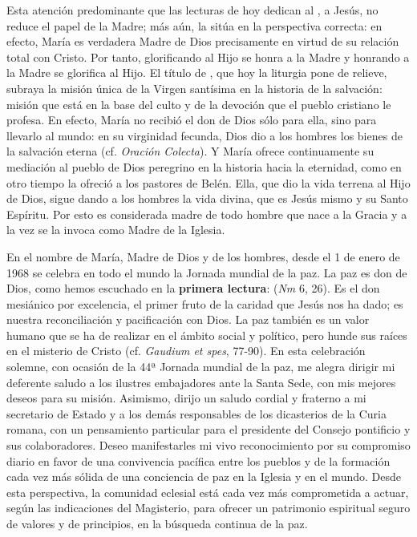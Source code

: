 {Esta atención predominante que las lecturas de hoy dedican al , a Jesús, no reduce el papel de la Madre; más aún, la sitúa en la perspectiva correcta: en efecto, María es verdadera Madre de Dios precisamente en virtud de su relación total con Cristo. Por tanto, glorificando al Hijo se honra a la Madre y honrando a la Madre se glorifica al Hijo. El título de , que hoy la liturgia pone de relieve, subraya la misión única de la Virgen santísima en la historia de la salvación: misión que está en la base del culto y de la devoción que el pueblo cristiano le profesa. En efecto, María no recibió el don de Dios sólo para ella, sino para llevarlo al mundo: en su virginidad fecunda, Dios dio a los hombres los bienes de la salvación eterna (cf. \emph{Oración Colecta}). Y María ofrece continuamente su mediación al pueblo de Dios peregrino en la historia hacia la eternidad, como en otro tiempo la ofreció a los pastores de Belén. Ella, que dio la vida terrena al Hijo de Dios, sigue dando a los hombres la vida divina, que es Jesús mismo y su Santo Espíritu. Por esto es considerada madre de todo hombre que nace a la Gracia y a la vez se la invoca como Madre de la Iglesia.

En el nombre de María, Madre de Dios y de los hombres, desde el 1 de enero de 1968 se celebra en todo el mundo la Jornada mundial de la paz. La paz es don de Dios, como hemos escuchado en la \textbf{primera lectura}:  (\emph{Nm} 6, 26). Es el don mesiánico por excelencia, el primer fruto de la caridad que Jesús nos ha dado; es nuestra reconciliación y pacificación con Dios. La paz también es un valor humano que se ha de realizar en el ámbito social y político, pero hunde sus raíces en el misterio de Cristo (cf. \emph{Gaudium et spes}, 77-90). En esta celebración solemne, con ocasión de la 44ª Jornada mundial de la paz, me alegra dirigir mi deferente saludo a los ilustres embajadores ante la Santa Sede, con mis mejores deseos para su misión. Asimismo, dirijo un saludo cordial y fraterno a mi secretario de Estado y a los demás responsables de los dicasterios de la Curia romana, con un pensamiento particular para el presidente del Consejo pontificio  y sus colaboradores. Deseo manifestarles mi vivo reconocimiento por su compromiso diario en favor de una convivencia pacífica entre los pueblos y de la formación cada vez más sólida de una conciencia de paz en la Iglesia y en el mundo. Desde esta perspectiva, la comunidad eclesial está cada vez más comprometida a actuar, según las indicaciones del Magisterio, para ofrecer un patrimonio espiritual seguro de valores y de principios, en la búsqueda continua de la paz.

}
